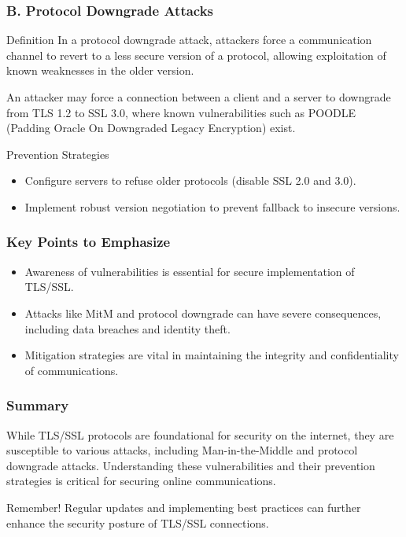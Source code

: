 \documentclass{beamer}
\begin{document}
\begin{frame}[fragile]
    \frametitle{B. Protocol Downgrade Attacks}
    \begin{block}{Definition}
        In a protocol downgrade attack, attackers force a communication channel to revert to a less secure version of a protocol, allowing exploitation of known weaknesses in the older version.
    \end{block}
    
    \begin{example}
        An attacker may force a connection between a client and a server to downgrade from TLS 1.2 to SSL 3.0, where known vulnerabilities such as POODLE (Padding Oracle On Downgraded Legacy Encryption) exist.
    \end{example}
    
    \begin{block}{Prevention Strategies}
        \begin{itemize}
            \item Configure servers to refuse older protocols (disable SSL 2.0 and 3.0).
            \item Implement robust version negotiation to prevent fallback to insecure versions.
        \end{itemize}
    \end{block}
\end{frame}

\begin{frame}[fragile]
    \frametitle{Key Points to Emphasize}
    \begin{itemize}
        \item Awareness of vulnerabilities is essential for secure implementation of TLS/SSL.
        \item Attacks like MitM and protocol downgrade can have severe consequences, including data breaches and identity theft.
        \item Mitigation strategies are vital in maintaining the integrity and confidentiality of communications.
    \end{itemize}
\end{frame}

\begin{frame}[fragile]
    \frametitle{Summary}
    While TLS/SSL protocols are foundational for security on the internet, they are susceptible to various attacks, including Man-in-the-Middle and protocol downgrade attacks. Understanding these vulnerabilities and their prevention strategies is critical for securing online communications.

    \begin{block}{Remember!}
        Regular updates and implementing best practices can further enhance the security posture of TLS/SSL connections.
    \end{block}
\end{frame}
\end{document}
